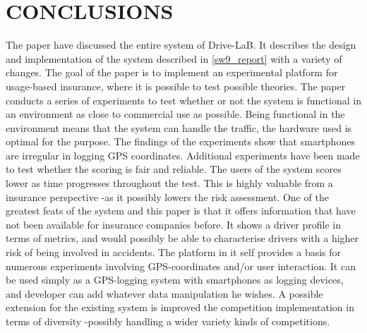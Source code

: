 \section{CONCLUSIONS}\label{sec:conclusion}
The paper have discussed the entire system of Drive-LaB. It describes the design and implementation of the system described in \ref{sw9_report} with a variety of changes. The goal of the paper is to implement an experimental platform for usage-based insurance, where it is possible to test possible theories. The paper conducts a series of experiments to test whether or not the system is functional in an environment as close to commercial use as possible. Being functional in the environment means that the system can handle the traffic, the hardware used is optimal for the purpose. The findings of the experiments show that smartphones are irregular in logging GPS coordinates. 
Additional experiments have been made to test whether the scoring is fair and reliable. The users of the system scores lower as time progresses throughout the test. This is highly valuable from a insurance perspective -as it possibly lowers the risk assessment. One of the greatest feats of the system and this paper is that it offers information that have not been available for insurance companies before. It shows a driver profile in terms of metrics, and would possibly be able to characterise drivers with a higher risk of being involved in accidents.
The platform in it self provides a basis for numerous experiments involving GPS-coordinates and/or user interaction. It can be used simply as a GPS-logging system with smartphones as logging devices, and developer can add whatever data manipulation he wishes.
A possible extension for the existing system is improved the competition implementation in terms of diversity -possibly handling a wider variety kinds of competitions.


\addtolength{\textheight}{-12cm}   %
